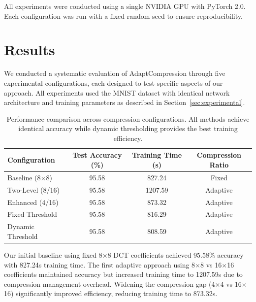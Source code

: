 \documentclass{article} %
\begin{document}
All experiments were conducted using a single NVIDIA GPU with PyTorch 2.0. Each configuration was run with a fixed random seed to ensure reproducibility.

\section{Results}
\label{sec:results}

We conducted a systematic evaluation of AdaptCompression through five experimental configurations, each designed to test specific aspects of our approach. All experiments used the MNIST dataset with identical network architecture and training parameters as described in Section~\ref{sec:experimental}.

\begin{table}[t]
\centering
\begin{tabular}{lccc}
\toprule
Configuration & Test Accuracy (\%) & Training Time (s) & Compression Ratio \\
\midrule
Baseline (8$\times$8) & 95.58 & 827.24 & Fixed \\
Two-Level (8/16) & 95.58 & 1207.59 & Adaptive \\
Enhanced (4/16) & 95.58 & 873.32 & Adaptive \\
Fixed Threshold & 95.58 & 816.29 & Adaptive \\
Dynamic Threshold & 95.58 & 808.59 & Adaptive \\
\bottomrule
\end{tabular}
\caption{Performance comparison across compression configurations. All methods achieve identical accuracy while dynamic thresholding provides the best training efficiency.}
\label{tab:results}
\end{table}

Our initial baseline using fixed 8$\times$8 DCT coefficients achieved 95.58\% accuracy with 827.24s training time. The first adaptive approach using 8$\times$8 vs 16$\times$16 coefficients maintained accuracy but increased training time to 1207.59s due to compression management overhead. Widening the compression gap (4$\times$4 vs 16$\times$16) significantly improved efficiency, reducing training time to 873.32s.
\end{document}
